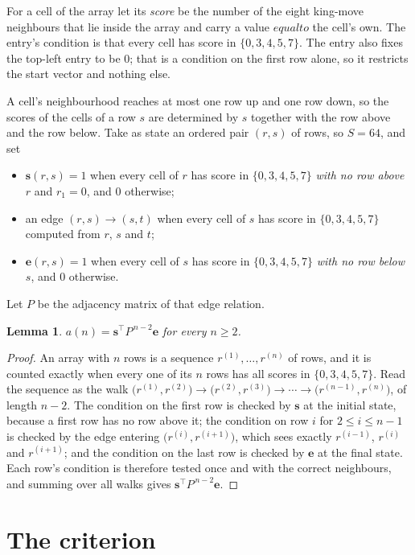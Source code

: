 \documentclass[11pt,a4paper]{article}
\theoremstyle{plain}
\newtheorem{lemma}[theorem]{Lemma}
\theoremstyle{definition}
\begin{document}
For a cell of the array let its \emph{score} be the number of the eight king-move neighbours that lie inside
the array and carry a value $equal to$ the cell's own. The entry's condition is that every cell
has score in $\{0,3,4,5,7\}$. The entry also fixes the top-left entry to be $0$; that is a condition on the first row alone, so it restricts the start vector and nothing else.

A cell's neighbourhood reaches at most one row up and one row down, so the scores of the
cells of a row $s$ are determined by $s$ together with the row above and the row below.
Take as state an ordered pair $(r,s)$ of rows, so $S=64$, and set
\begin{itemize}
\item $\mathbf{s}(r,s)=1$ when every cell of $r$ has score in $\{0,3,4,5,7\}$ \emph{with no row
above $r$} and $r_1=0$, and $0$ otherwise;
\item an edge $(r,s)\to(s,t)$ when every cell of $s$ has score in $\{0,3,4,5,7\}$ computed from
$r$, $s$ and $t$;
\item $\mathbf{e}(r,s)=1$ when every cell of $s$ has score in $\{0,3,4,5,7\}$ \emph{with no row
below $s$}, and $0$ otherwise.
\end{itemize}
Let $P$ be the adjacency matrix of that edge relation.

\begin{lemma}\label{lem:walk}
$a(n)=\mathbf{s}^{\!\top}P^{\,n-2}\mathbf{e}$ for every $n\ge2$.
\end{lemma}

\begin{proof}
An array with $n$ rows is a sequence $r^{(1)},\dots,r^{(n)}$ of rows, and it is counted
exactly when every one of its $n$ rows has all scores in $\{0,3,4,5,7\}$. Read the sequence as the
walk $\bigl(r^{(1)},r^{(2)}\bigr)\to\bigl(r^{(2)},r^{(3)}\bigr)\to\cdots\to
\bigl(r^{(n-1)},r^{(n)}\bigr)$, of length $n-2$. The condition on the first row is
checked by $\mathbf{s}$ at the initial state, because a first row has no row above it; the
condition on row $i$ for $2\le i\le n-1$ is checked by the edge entering
$\bigl(r^{(i)},r^{(i+1)}\bigr)$, which sees exactly $r^{(i-1)}$, $r^{(i)}$ and
$r^{(i+1)}$; and the condition on the last row is checked by $\mathbf{e}$ at the final
state. Each row's condition is therefore tested once and with the correct neighbours, and
summing over all walks gives $\mathbf{s}^{\!\top}P^{\,n-2}\mathbf{e}$.
\end{proof}

\section{The criterion}
\end{document}
